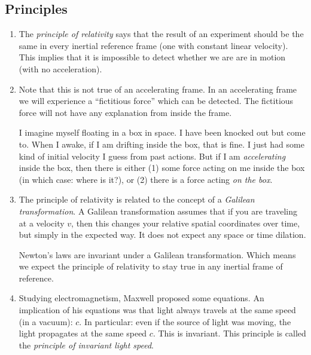 \subsection{Principles}

\begin{enumerate}

  \item The \emph{principle of relativity} says that the result of an
  experiment should be the same in every inertial reference frame (one
  with constant linear velocity). This implies that it is impossible to
  detect whether we are are in motion (with no acceleration).

  \item Note that this is not true of an accelerating frame. In an
  accelerating frame we will experience a ``fictitious force'' which can
  be detected. The fictitious force will not have any explanation from
  inside the frame.

  I imagine myself floating in a box in space. I have been knocked out
  but come to. When I awake, if I am drifting inside the box, that is
  fine. I just had some kind of initial velocity I guess from past
  actions. But if I am \emph{accelerating} inside the box, then there
  is either (1) some force acting on me inside the box (in which case:
  where is it?), or (2) there is a force acting \emph{on the box}.


  \item The principle of relativity is related to the concept of a
  \emph{Galilean transformation}. A Galilean transformation assumes that
  if you are traveling at a velocity $v$, then this changes your
  relative spatial coordinates over time, but simply in the expected
  way. It does not expect any space or time dilation.

  Newton's laws are invariant under a Galilean transformation. Which
  means we expect the principle of relativity to stay true in any
  inertial frame of reference.

  \item Studying electromagnetism, Maxwell proposed some equations. An
  implication of his equations was that light always travels at the same
  speed (in a vacuum): $c$. In particular: even if the source of light
  was moving, the light propagates at the same speed $c$. This is
  invariant. This principle is called the \emph{principle of invariant
  light speed}.


\end{enumerate}
